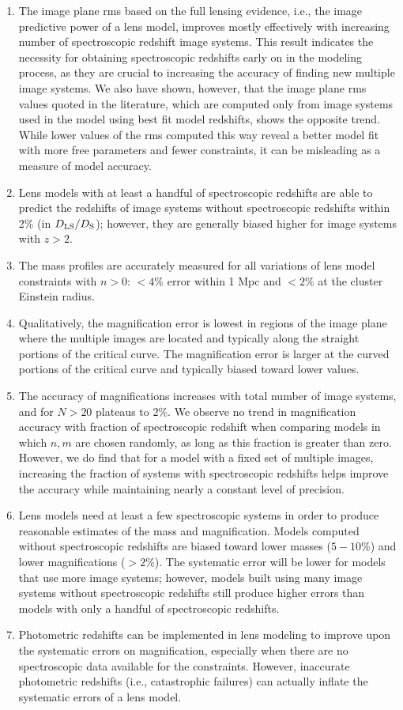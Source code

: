 \begin{enumerate}
\item The image plane rms based on the full lensing evidence, i.e., the image predictive power of a lens model, improves mostly effectively with increasing number of spectroscopic redshift image systems. This result indicates the necessity for obtaining spectroscopic redshifts early on in the modeling process, as they are crucial to increasing the accuracy of finding new multiple image systems. We also have shown, however, that the image plane rms values quoted in the literature, which are computed only from image systems used in the model using best fit model redshifts, shows the opposite trend. While lower values of the rms computed this way reveal a better model fit with more free parameters and fewer constraints, it can be misleading as a measure of model accuracy.
\item Lens models with at least a handful of spectroscopic redshifts are able to predict the redshifts of image systems without spectroscopic redshifts within 2\% (in $D_\mathrm{LS}/D_\mathrm{S}$); however, they are generally biased higher for image systems with $z>2$.
\item The mass profiles are accurately measured for all variations of lens model constraints with $n>0$: $<4\%$ error within 1 Mpc and $<2\%$ at the cluster Einstein radius.
\item Qualitatively, the magnification error is lowest in regions of the image plane where the multiple images are located and typically along the straight portions of the critical curve. The magnification error is larger at the curved portions of the critical curve and typically biased toward lower values.
\item The accuracy of magnifications increases with total number of image systems, and for $N>20$ plateaus to 2\%. We observe no trend in magnification accuracy with fraction of spectroscopic redshift when comparing models in which $n,m$ are chosen randomly, as long as this fraction is greater than zero. However, we do find that for a model with a fixed set of multiple images, increasing the fraction of systems with spectroscopic redshifts helps improve the accuracy while maintaining nearly a constant level of precision.
\item Lens models need at least a few spectroscopic systems in order to produce reasonable estimates of the mass and magnification. Models computed without spectroscopic redshifts are biased toward lower masses ($5-10\%$) and lower magnifications ($>2\%$). The systematic error will be lower for models that use more image systems; however, models built using many image systems without spectroscopic redshifts still produce higher errors than models with only a handful of spectroscopic redshifts.
\item Photometric redshifts can be implemented in lens modeling to improve upon the systematic errors on magnification, especially when there are no spectroscopic data available for the constraints. However, inaccurate photometric redshifts (i.e., catastrophic failures) can actually inflate the systematic errors of a lens model.
\end{enumerate}

